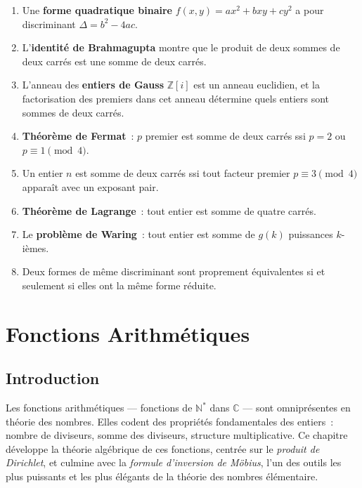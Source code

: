 \documentclass[12pt,a4paper,openany]{book}
\theoremstyle{definition}
\theoremstyle{plain}
\theoremstyle{remark}
\newcommand{\N}{\mathbb{N}}
\newcommand{\Z}{\mathbb{Z}}
\newcommand{\C}{\mathbb{C}}
\begin{document}
\begin{enumerate}[label=\textbf{\arabic*.}]
  \item Une \textbf{forme quadratique binaire} $f(x,y) = ax^2 + bxy + cy^2$ a pour
    discriminant $\Delta = b^2 - 4ac$.
  \item L'\textbf{identité de Brahmagupta} montre que le produit de deux sommes de deux
    carrés est une somme de deux carrés.
  \item L'anneau des \textbf{entiers de Gauss} $\Z[i]$ est un anneau euclidien, et la
    factorisation des premiers dans cet anneau détermine quels entiers sont sommes de
    deux carrés.
  \item \textbf{Théorème de Fermat}~: $p$ premier est somme de deux carrés ssi $p = 2$
    ou $p \equiv 1 \pmod{4}$.
  \item Un entier $n$ est somme de deux carrés ssi tout facteur premier
    $p \equiv 3 \pmod{4}$ apparaît avec un exposant pair.
  \item \textbf{Théorème de Lagrange}~: tout entier est somme de quatre carrés.
  \item Le \textbf{problème de Waring}~: tout entier est somme de $g(k)$ puissances
    $k$-ièmes.
  \item Deux formes de même discriminant sont proprement équivalentes si et seulement si
    elles ont la même forme réduite.
\end{enumerate}

\newpage

\chapter{Fonctions Arithmétiques}
\label{chap:fonctions-arithmetiques}

\section*{Introduction}

Les fonctions arithmétiques --- fonctions de $\N^*$ dans $\C$ --- sont omniprésentes en
théorie des nombres. Elles codent des propriétés fondamentales des entiers~: nombre de
diviseurs, somme des diviseurs, structure multiplicative. Ce chapitre développe la théorie
algébrique de ces fonctions, centrée sur le \emph{produit de Dirichlet}, et culmine avec
la \emph{formule d'inversion de Möbius}, l'un des outils les
plus puissants et les plus élégants de la théorie des nombres élémentaire.
\end{document}
